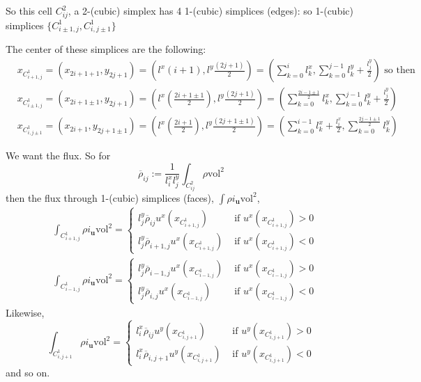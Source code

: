 \documentclass[10pt]{amsart}
\begin{document}
\begin{multicols*}{2}
So this cell $C^2_{ij}$, a 2-(cubic) simplex has 4 1-(cubic) simplices (edges): so 1-(cubic) simplices $\lbrace C_{i\pm 1, j }^1, C^1_{i,j\pm1}\rbrace$

The center of these simplices are the following:
\[
\begin{aligned}
  & x_{C^1_{i+1,j}} = (x_{2i+1+1},y_{2j+1}) = (l^x(i+1), l^y\frac{(2j+1)}{2} ) = \left( \sum_{k=0}^i l_k^x, \sum_{k=0}^{j-1} l_k^y + \frac{l_j^y}{2} \right) \text{ so then } \\ 
  & x_{C^1_{i\pm 1,j}} = (x_{2i+1\pm 1},y_{2j+1}) = (l^x\left( \frac{2i+1\pm 1}{2}\right) , l^y\frac{(2j+1)}{2} ) = \left( \sum_{k=0}^{ \frac{2i - 1 \pm 1 }{2} } l_k^x, \sum_{k=0}^{j-1} l_k^y + \frac{l_j^y}{2} \right) \\ 
  &  x_{C^1_{i,j\pm 1}} = (x_{2i+1},y_{2j+1 \pm 1}) = (l^x\left( \frac{2i+1}{2}\right) , l^y\frac{(2j+1 \pm 1)}{2} ) = \left(  \sum_{k=0}^{i-1} l_k^x + \frac{l_i^x}{2} , \sum_{k=0}^{ \frac{2j - 1 \pm 1 }{2} } l_k^y  \right)
\end{aligned}
\]

We want the flux.  So for
\[
\overline{\rho}_{ij} := \frac{1}{l_i^x l_j^y} \int_{C^2_{ij}} \rho \text{vol}^2
\]
then the flux through 1-(cubic) simplices (faces), $\int \rho i_{\mathbf{u}}\text{vol}^2$,
\[
\begin{aligned}
 &  \int_{C^1_{i+1,j}} \rho i_{\mathbf{u}} \text{vol}^2 = \begin{cases} l_j^y \overline{\rho}_{ij} u^x(x_{C^1_{i+1, j} } ) & \text{ if } u^x(x_{C^1_{i+1,j} }) > 0 \\ 
 l_j^y \overline{\rho}_{i+1,j} u^x(x_{C^1_{i+1, j} } ) & \text{ if } u^x(x_{C^1_{i+1,j} }) < 0 \end{cases} \\
&      \int_{C^1_{i-1,j}} \rho i_{\mathbf{u}} \text{vol}^2 = \begin{cases} l_j^y \overline{\rho}_{i-1,j} u^x(x_{C^1_{i-1, j} } ) & \text{ if } u^x(x_{C^1_{i-1,j} }) > 0 \\ 
 l_j^y \overline{\rho}_{i,j} u^x(x_{C^1_{i-1, j} } ) & \text{ if } u^x(x_{C^1_{i-1,j} }) < 0 \end{cases}
\end{aligned}
\]
Likewise,
\[
\int_{C^1_{i,j+1}} \rho i_{\mathbf{u}} \text{vol}^2 = \begin{cases} l_i^x \overline{\rho}_{ij} u^y(x_{C^1_{i, j+1} } ) & \text{ if } u^y(x_{C^1_{i,j+1} }) > 0 \\ 
 l_i^x \overline{\rho}_{i,j+1} u^y(x_{C^1_{i, j+1} } ) & \text{ if } u^y(x_{C^1_{i,j+1} }) < 0 \end{cases}
\]
and so on.




\end{multicols*}
\end{document}
